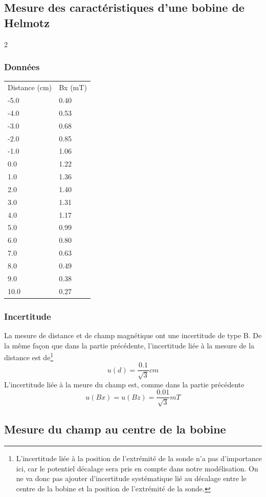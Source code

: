 \documentclass[a4paper,9pt,french]{scrartcl}
\begin{document}
\subsection{Mesure des caractéristiques d'une bobine de Helmotz}
\begin{multicols}{2}
\subsubsection{Données}
\begin{center}
\begin{tabular}{ll}
Distance (cm) & Bx (mT)\\
-5.0 & 0.40\\
-4.0 & 0.53\\
-3.0 & 0.68\\
-2.0 & 0.85\\
-1.0 & 1.06\\
0.0 & 1.22\\
1.0 & 1.36\\
2.0 & 1.40\\
3.0 & 1.31\\
4.0 & 1.17\\
5.0 & 0.99\\
6.0 & 0.80\\
7.0 & 0.63\\
8.0 & 0.49\\
9.0 & 0.38\\
10.0 & 0.27
\end{tabular}
\end{center}
\subsubsection{Incertitude}
La mesure de distance et de champ magnétique ont une incertitude de type B. De la m\^eme façon que dans la partie précédente, l'incertitude liée à la mesure de la distance est de\footnote{L'incertitude liée à la position de l'extrémité de la sonde n'a pas d'importance ici, car le potentiel décalage sera pris en compte dans notre modélisation. On ne va donc pas ajouter d'incertitude systématique lié au décalage entre le centre de la bobine et la position de l'extrémité de la sonde.} \[u(d) = \frac{0.1}{\sqrt{3}}cm\]
L'incertitude liée à la meure du champ est, comme dans la partie précédente \[u(Bx) = u(Bz) = \frac{0.01}{\sqrt{3}}mT\]
\end{multicols}
\subsection{Mesure du champ au centre de la bobine}
\end{document}
